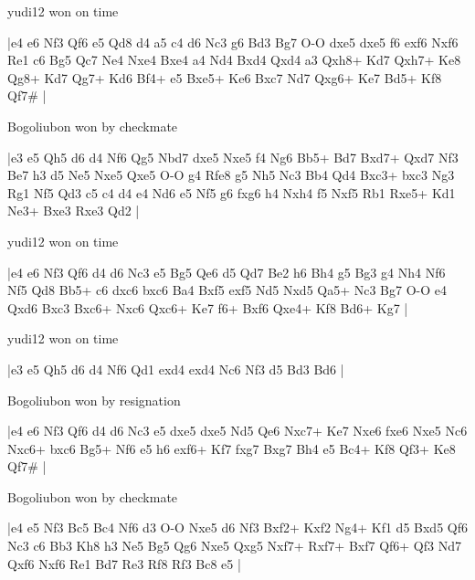 \showboard

yudi12 won on time

\makegametitle
|e4 e6 Nf3 Qf6 e5 Qd8 d4 a5 c4 d6 Nc3 g6 Bd3 Bg7 O-O dxe5 dxe5 f6 exf6 Nxf6 Re1 c6 Bg5 Qc7 Ne4 Nxe4 Bxe4 a4 Nd4 Bxd4 Qxd4 a3 Qxh8+ Kd7 Qxh7+ Ke8 Qg8+ Kd7 Qg7+ Kd6 Bf4+ e5 Bxe5+ Ke6 Bxc7 Nd7 Qxg6+ Ke7 Bd5+ Kf8 Qf7\#  |

\showboard

Bogoliubon won by checkmate

\makegametitle
|e3 e5 Qh5 d6 d4 Nf6 Qg5 Nbd7 dxe5 Nxe5 f4 Ng6 Bb5+ Bd7 Bxd7+ Qxd7 Nf3 Be7 h3 d5 Ne5 Nxe5 Qxe5 O-O g4 Rfe8 g5 Nh5 Nc3 Bb4 Qd4 Bxc3+ bxc3 Ng3 Rg1 Nf5 Qd3 c5 c4 d4 e4 Nd6 e5 Nf5 g6 fxg6 h4 Nxh4 f5 Nxf5 Rb1 Rxe5+ Kd1 Ne3+ Bxe3 Rxe3 Qd2  |

\showboard

yudi12 won on time

\makegametitle
|e4 e6 Nf3 Qf6 d4 d6 Nc3 e5 Bg5 Qe6 d5 Qd7 Be2 h6 Bh4 g5 Bg3 g4 Nh4 Nf6 Nf5 Qd8 Bb5+ c6 dxc6 bxc6 Ba4 Bxf5 exf5 Nd5 Nxd5 Qa5+ Nc3 Bg7 O-O e4 Qxd6 Bxc3 Bxc6+ Nxc6 Qxc6+ Ke7 f6+ Bxf6 Qxe4+ Kf8 Bd6+ Kg7  |

\showboard

yudi12 won on time

\makegametitle
|e3 e5 Qh5 d6 d4 Nf6 Qd1 exd4 exd4 Nc6 Nf3 d5 Bd3 Bd6  |

\showboard

Bogoliubon won by resignation

\makegametitle
|e4 e6 Nf3 Qf6 d4 d6 Nc3 e5 dxe5 dxe5 Nd5 Qe6 Nxc7+ Ke7 Nxe6 fxe6 Nxe5 Nc6 Nxc6+ bxc6 Bg5+ Nf6 e5 h6 exf6+ Kf7 fxg7 Bxg7 Bh4 e5 Bc4+ Kf8 Qf3+ Ke8 Qf7\#  |

\showboard

Bogoliubon won by checkmate

\makegametitle
|e4 e5 Nf3 Bc5 Bc4 Nf6 d3 O-O Nxe5 d6 Nf3 Bxf2+ Kxf2 Ng4+ Kf1 d5 Bxd5 Qf6 Nc3 c6 Bb3 Kh8 h3 Ne5 Bg5 Qg6 Nxe5 Qxg5 Nxf7+ Rxf7+ Bxf7 Qf6+ Qf3 Nd7 Qxf6 Nxf6 Re1 Bd7 Re3 Rf8 Rf3 Bc8 e5  |

\showboard

